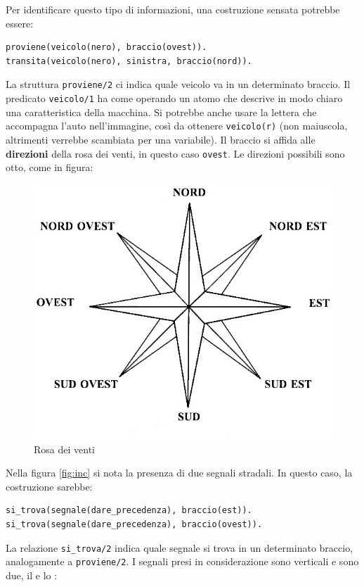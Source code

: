 Per identificare questo tipo di informazioni, una costruzione sensata potrebbe essere:
\begin{verbatim}
proviene(veicolo(nero), braccio(ovest)).
transita(veicolo(nero), sinistra, braccio(nord)).
\end{verbatim}

La struttura \texttt{proviene/2} ci indica quale veicolo va in un determinato braccio. Il predicato \texttt{veicolo/1} ha come operando un atomo che descrive in modo chiaro una caratteristica della macchina. Si potrebbe anche usare la lettera che accompagna l'auto nell'immagine, così da ottenere \texttt{veicolo(r)} (non maiuscola, altrimenti verrebbe scambiata per una variabile). Il braccio si affida alle \textbf{direzioni} della rosa dei venti, in questo caso \texttt{ovest}. Le direzioni possibili sono otto, come in figura:

\begin{figure}[htb]
	\centering
	\includegraphics[width=.5\textwidth]{images/rose}
	\caption{Rosa dei venti}
	\label{fig:rose}
\end{figure}

Nella figura \ref{fig:inc} si nota la presenza di due segnali stradali. In questo caso, la costruzione sarebbe:
\begin{verbatim}
si_trova(segnale(dare_precedenza), braccio(est)).
si_trova(segnale(dare_precedenza), braccio(ovest)).
\end{verbatim}

La relazione \texttt{si\_trova/2} indica quale segnale si trova in un determinato braccio, analogamente a \texttt{proviene/2}. I segnali presi in considerazione sono verticali e sono due, il  e lo :

